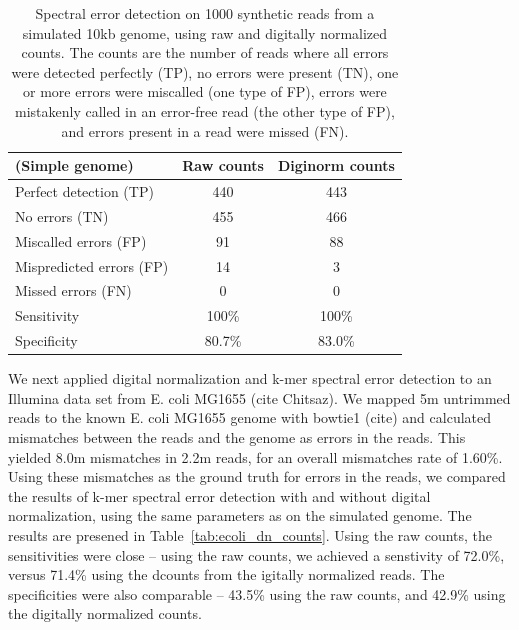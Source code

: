 \documentclass{article}
\begin{document}
\begin{table}
\begin{tabular}{|l|c|c|}
\hline
(Simple genome) & Raw counts & Diginorm counts \\
\hline
Perfect detection (TP) & 440 & 443 \\
No errors (TN) & 455 & 466 \\
Miscalled errors (FP) & 91 & 88 \\
Mispredicted errors (FP) & 14 & 3 \\
Missed errors (FN) & 0 & 0 \\
\hline
Sensitivity & 100\% & 100\% \\
Specificity & 80.7\% & 83.0\% \\
\hline
\end{tabular}
\label{tab:a}

\caption{Spectral error detection on 1000 synthetic reads from a
  simulated 10kb genome, using raw and digitally normalized
  counts.  The counts are the number of reads where all errors were
  detected perfectly (TP), no errors were present (TN), one or more errors were miscalled (one type of FP), errors were mistakenly called in an error-free read (the other type of FP), and errors present in a read were missed (FN). }
\end{table}


We next applied digital normalization and k-mer spectral error
detection to an Illumina data set from E. coli MG1655 (cite Chitsaz).
We mapped 5m untrimmed reads to the known E. coli MG1655 genome with
bowtie1 (cite) and calculated mismatches between the reads and the
genome as errors in the reads.  This yielded 8.0m mismatches in 2.2m
reads, for an overall mismatches rate of 1.60\%.  Using these
mismatches as the ground truth for errors in the reads, we compared
the results of k-mer spectral error detection with and without digital
normalization, using the same parameters as on the simulated genome.
The results are presened in Table~\ref{tab:ecoli_dn_counts}. Using the
raw counts, the sensitivities were close -- using the raw counts, we
achieved a senstivity of 72.0\%, versus 71.4\% using the dcounts from
the igitally normalized reads.  The specificities were also comparable
-- 43.5\% using the raw counts, and 42.9\% using the digitally
normalized counts.
\end{document}
